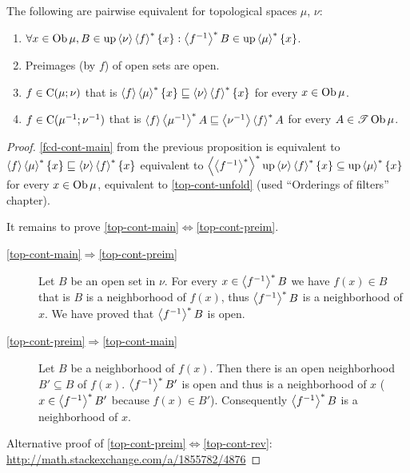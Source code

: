 \begin{cor}
  The following are pairwise equivalent for topological spaces $\mu$,
  $\nu$:
  \begin{enumerate}
    \item\label{top-cont-unfold} $\forall x \in \operatorname{Ob} \mu, B \in \operatorname{up} \left\langle \nu\right\rangle
    \left\langle f\right\rangle ^{\ast} \{x\} : \left\langle f^{- 1}\right\rangle ^{\ast} B \in
    \operatorname{up} \left\langle \mu\right\rangle ^{\ast} \{x\}$.

    \item\label{top-cont-preim} Preimages (by $f$) of open sets are open.

    \item\label{top-cont-main} $f \in \mathrm{C} (\mu; \nu)$ that is $\left\langle f\right\rangle
    \left\langle \mu\right\rangle ^{\ast} \{ x \} \sqsubseteq \left\langle \nu\right\rangle
    \left\langle f\right\rangle ^{\ast} \{ x \}$ for every $x \in \operatorname{Ob} \mu$.

    \item\label{top-cont-rev} $f \in \mathrm{C} (\mu^{- 1} ; \nu^{- 1})$ that is $\left\langle f\right\rangle
    \left\langle \mu^{- 1}\right\rangle ^{\ast} A \sqsubseteq \left\langle \nu^{- 1}\right\rangle
    \left\langle f\right\rangle ^{\ast} A$ for every $A \in \mathscr{T}
    \operatorname{Ob} \mu$.
  \end{enumerate}
\end{cor}

\begin{proof}
  \ref{fcd-cont-main} from the previous proposition is equivalent to
  $\left\langle f\right\rangle\left\langle \mu\right\rangle ^{\ast}\{x\}\sqsubseteq\left\langle \nu\right\rangle\left\langle f\right\rangle ^{\ast}\{x\}$
  equivalent to $\left\langle \left\langle f^{- 1}\right\rangle ^{\ast}\right\rangle ^{\ast}
  \operatorname{up} \left\langle \nu\right\rangle \left\langle f\right\rangle ^{\ast} \{ x \} \subseteq
  \operatorname{up} \left\langle \mu\right\rangle ^{\ast} \{ x \}$ for every $x \in \operatorname{Ob}
  \mu$, equivalent to \ref{top-cont-unfold} (used ``Orderings of filters'' chapter).

  It remains to prove \ref{top-cont-main}$\Leftrightarrow$\ref{top-cont-preim}.

  \begin{description}
  \item[\ref{top-cont-main}$\Rightarrow$\ref{top-cont-preim}] Let $B$ be an open set in $\nu$. For every $x \in
  \left\langle f^{- 1}\right\rangle ^{\ast} B$ we have $f (x) \in B$ that is $B$ is a
  neighborhood of $f (x)$, thus $\left\langle f^{-1}\right\rangle ^{\ast}B$ is a neighborhood of $x$. We have
  proved that $\left\langle f^{- 1}\right\rangle ^{\ast} B$ is open.

  \item[\ref{top-cont-preim}$\Rightarrow$\ref{top-cont-main}] Let $B$ be a neighborhood of $f (x)$. Then there is an
  open neighborhood $B' \subseteq B$ of $f (x)$. $\left\langle f^{-1}\right\rangle ^{\ast}
  B'$ is open and thus is a neighborhood of $x$ ($x \in \left\langle f^{-1}\right\rangle ^{\ast} B'$ because $f (x) \in B'$). Consequently
  $\left\langle f^{-1}\right\rangle ^{\ast} B$ is a neighborhood of $x$.
  \end{description}

  Alternative proof of \ref{top-cont-preim}$\Leftrightarrow$\ref{top-cont-rev}:
  \url{http://math.stackexchange.com/a/1855782/4876}
\end{proof}

